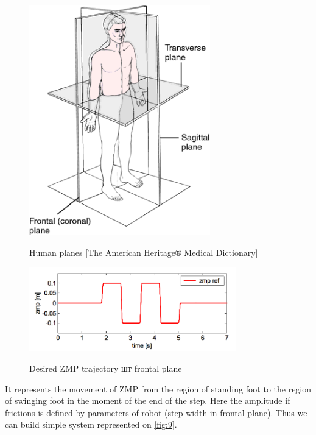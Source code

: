 \documentclass[12pt,a4paper]{report}
\begin{document}
		\begin{figure}[h!]
			\vspace{-0.2cm}
			\centering
			{\includegraphics[width=0.7\textwidth]{7}}
			\caption{Human planes [The American Heritage® Medical Dictionary]}
			\label{fig:7}
			\vspace{-0.1cm}
		\end{figure}
		\begin{figure}[h!]
			\vspace{-0.2cm}
			\centering
			{\includegraphics[width=0.8\textwidth]{8}}
			\caption{Desired ZMP trajectory шт frontal plane \cite{kajita2003biped}}
			\label{fig:8}
			\vspace{-0.1cm}
		\end{figure}
		It represents the movement of ZMP from the region of standing foot to the region of swinging foot in the moment of the end of the step. Here the amplitude if frictions is defined by parameters of robot (step width in frontal plane). Thus we can build simple system represented on \cref{fig:9}.
\end{document}
